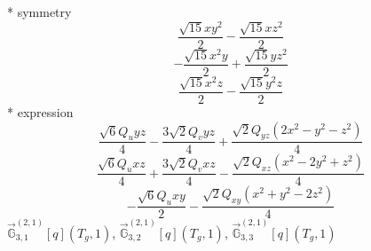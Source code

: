 \documentclass[fleqn,8pt]{jsarticle}
\begin{document}
\noindent\quad ** symmetry
\begin{dmath*}
\frac{\sqrt{15} x y^{2}}{2} - \frac{\sqrt{15} x z^{2}}{2}
\end{dmath*}
\begin{dmath*}
- \frac{\sqrt{15} x^{2} y}{2} + \frac{\sqrt{15} y z^{2}}{2}
\end{dmath*}
\begin{dmath*}
\frac{\sqrt{15} x^{2} z}{2} - \frac{\sqrt{15} y^{2} z}{2}
\end{dmath*}
\noindent\quad ** expression
\begin{dmath*}
\frac{\sqrt{6} Q_{u} y z}{4} - \frac{3 \sqrt{2} Q_{v} y z}{4} + \frac{\sqrt{2} Q_{yz} \left(2 x^{2} - y^{2} - z^{2}\right)}{4}
\end{dmath*}
\begin{dmath*}
\frac{\sqrt{6} Q_{u} x z}{4} + \frac{3 \sqrt{2} Q_{v} x z}{4} - \frac{\sqrt{2} Q_{xz} \left(x^{2} - 2 y^{2} + z^{2}\right)}{4}
\end{dmath*}
\begin{dmath*}
- \frac{\sqrt{6} Q_{u} x y}{2} - \frac{\sqrt{2} Q_{xy} \left(x^{2} + y^{2} - 2 z^{2}\right)}{4}
\end{dmath*}
\noindent\quad $\vec{\mathbb{G}}_{3,1}^{(2,1)}[q](T_{g},1)$, $\vec{\mathbb{G}}_{3,2}^{(2,1)}[q](T_{g},1)$, $\vec{\mathbb{G}}_{3,3}^{(2,1)}[q](T_{g},1)$
\end{document}
